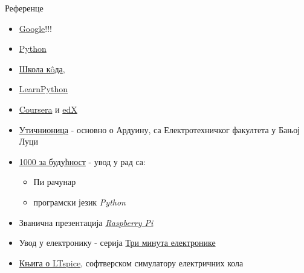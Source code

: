 \documentclass{beamer}
\begin{document}
\begin{frame}{Референце}
\begin{itemize}
    \item \color{violet}\href{https://www.google.com/}{Google}!!!
    \item \href{python.org}{Python}
    \item \color{violet}\href{https://skolakoda.github.io/kursevi/}{Школа к\^{o}да}, \color{black} 
    \item \color{violet}\href{https://www.learnpython.org/}{LearnPython}
    \item \color{violet}\href{https://www.coursera.org/}{Coursera} \color{black}и \color{violet}\href{https://www.edx.org/}{edX}
    \item \color{violet}\href{http://uticnionica.etf.unibl.org/}{Утичнионица}\color{black} - основно о Ардуину, са Електротехничког факултета у Бањој Луци
    \item \color{violet}\href{http://1000zabuducnost.org/}{1000 за будућност}\color{black} - увод у рад са:
    \begin{itemize}
        \item Пи рачунар
        \item програмски језик \textit{Python}
    \end{itemize}
    \item Званична презентација \color{violet}\href{https://www.raspberrypi.org/}{\textit{Raspberry Pi}}\color{black}
    \item Увод у електронику - серија \color{violet}\href{https://www.youtube.com/playlist?list=PLh-StTZA7RZ6Ch6Esin2mnoPzFvLZOYu3}{Три минута електронике}
    \item \href{https://www.nanoluka.org}{Књига о LTspice}\color{black}, софтверском симулатору електричних кола
\end{itemize}
\end{frame}
\end{document}

